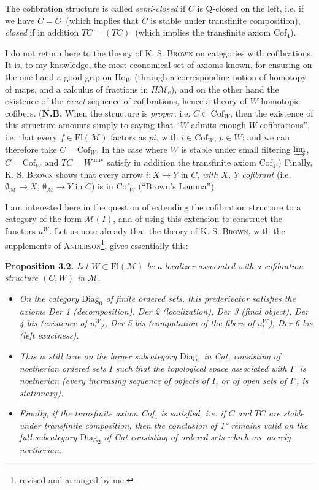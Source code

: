 \documentclass[11pt]{article}
\newcommand{\printedpage}[1]{\marginpar{\footnotesize p.~#1}}
\newcommand{\msp}[1]{\marginpar{\footnotesize [#1]}}
\newcommand{\M}{\mathcal{M}}
\newcommand{\Ho}{\mathrm{Ho}}
\newcommand{\Fl}{\mathrm{Fl}}
\newcommand{\Cof}{\mathrm{Cof}}
\newcommand{\Diag}{\mathrm{Diag}}
\newcommand{\Qs}{\tilde{\ }}
\begin{document}
The cofibration structure is called \textit{semi-closed} if $C$ is Q-closed on the left, i.e. if we have $C=C\Qs$ (which implies that $C$ is stable under transfinite composition), \textit{closed} if in addition $TC=(TC)\Qs$ (which implies the transfinite axiom Cof$_4$).

\msp{page 35}
I do not return here to the theory of K. S. \textsc{Brown} on categories with cofibrations. It is, to my knowledge, the most economical set of axioms known, for ensuring on the one hand a good grip on $\Ho_W$ (through a corresponding notion of homotopy of maps, and a calculus of fractions in $\Pi\M_{\mathrm{c}}$), and on the other hand the existence of the \textit{exact} sequence of cofibrations, hence a theory of $W$-homotopic cofibers. (\textbf{N.B.} When the structure is \textit{proper,} i.e. $C\subset\Cof_W$, then the existence of this structure amounts simply to saying that ``$W$ admits enough $W$-cofibrations'', i.e. that every $f\in\Fl(\M)$ factors as $pi$, with $i\in\Cof_W$, $p\in W$; and we can therefore take $C=\Cof_W$. In the case where $W$ is stable under small filtering $\varinjlim$, $C=\Cof_W$ and $TC=W^{\mathrm{univ}}$ satisfy in addition the transfinite axiom Cof$_4$.) Finally, K. S. \textsc{Brown} shows that every arrow $i : X\longrightarrow Y$ in $C$, \textit{with $X$, $Y$ cofibrant} (i.e. $\emptyset_{\M}\longrightarrow X$, $\emptyset_{\M}\longrightarrow Y$ in $C$) is in $\Cof_W$ (``Brown's Lemma'').

I am interested here in the question of extending the cofibration structure to a category of the form $\M(I)$, and of using this extension to construct
\msp{page 36}
the functors $u^{W}_{!}$. Let us note already that the theory of K. S. \textsc{Brown}, with the supplements of \textsc{Anderson}\footnote[20]{revised and arranged by me.}, gives essentially this:

\printedpage{21}

\textbf{Proposition 3.2.} \textit{Let $W\subset\Fl(\M)$ be a localizer associated with a cofibration structure $(C,W)$ in $\M$.}
\begin{itemize}[leftmargin=3em,labelwidth=2.5em,align=right]
\item[1°)] \textit{On the category \textup{$\Diag_0$} of \textup{finite} ordered sets, this prederivator satisfies the axioms Der 1 (decomposition), Der 2 (localization), Der 3 (final object), Der 4 bis (existence of $u^{W}_{!}$), Der 5 bis (computation of the fibers of $u^{W}_{!}$), Der 6 bis (left exactness).}
\item[2°)] \textit{This is still true on the larger subcategory \textup{$\Diag_1$} in \textup{Cat}, consisting of \textup{noetherian} ordered sets $I$ such that the topological space associated with $I^{\circ}$ is noetherian (every increasing sequence of objects of $I$, or of open sets of $I^{\circ}$, is stationary).}
\item[3°)] \textit{Finally, if the transfinite axiom Cof$_4$ is satisfied, i.e. if $C$ and $TC$ are stable under transfinite composition, then the conclusion of \textup{1°} remains valid on the full subcategory \textup{$\Diag_2$} of \textup{Cat} consisting of ordered sets which are merely noetherian.}
\end{itemize}
\end{document}
